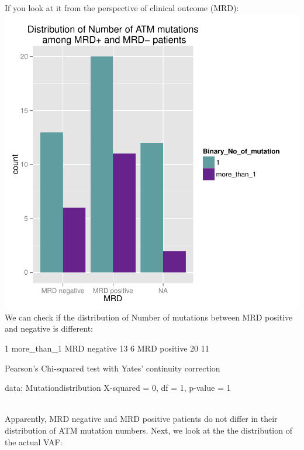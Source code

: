 \documentclass[a4paper,11pt]{article}
\begin{document}
\\If you look at it from the perspective of clinical outcome (MRD):\\
\includegraphics{ATM_VAF-004}
\\We can check if the distribution of Number of mutations between MRD positive and negative is different:\\
\begin{Schunk}
\begin{Soutput}
                1 more_than_1
  MRD negative 13           6
  MRD positive 20          11
\end{Soutput}
\begin{Soutput}
	Pearson's Chi-squared test with Yates' continuity correction

data:  Mutationdistribution
X-squared = 0, df = 1, p-value = 1
\end{Soutput}
\end{Schunk}
\\Apparently, MRD negative and MRD positive patients do not differ in their distribution of ATM mutation numbers. Next, we look at the the distribution of the actual VAF:\\
\end{document}
